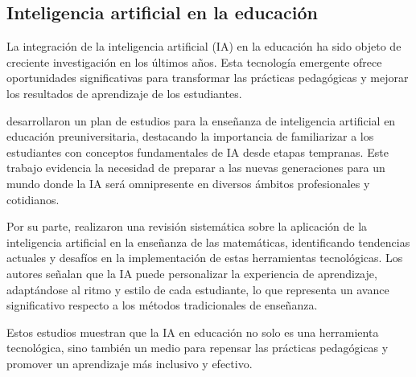 \subsection{Inteligencia artificial en la educación}

La integración de la inteligencia artificial (IA) en la educación ha sido objeto de creciente investigación en los últimos años. Esta tecnología emergente ofrece oportunidades significativas para transformar las prácticas pedagógicas y mejorar los resultados de aprendizaje de los estudiantes.

\cite{guerreirosantallaDesarrolloPlanEstudios2023} desarrollaron un plan de estudios para la enseñanza de inteligencia artificial en educación preuniversitaria, destacando la importancia de familiarizar a los estudiantes con conceptos fundamentales de IA desde etapas tempranas. Este trabajo evidencia la necesidad de preparar a las nuevas generaciones para un mundo donde la IA será omnipresente en diversos ámbitos profesionales y cotidianos.

Por su parte, \cite{panquebanInteligenciaArtificialEducacion2024a} realizaron una revisión sistemática sobre la aplicación de la inteligencia artificial en la enseñanza de las matemáticas, identificando tendencias actuales y desafíos en la implementación de estas herramientas tecnológicas. Los autores señalan que la IA puede personalizar la experiencia de aprendizaje, adaptándose al ritmo y estilo de cada estudiante, lo que representa un avance significativo respecto a los métodos tradicionales de enseñanza.

Estos estudios muestran que la IA en educación no solo es una herramienta tecnológica, sino también un medio para repensar las prácticas pedagógicas y promover un aprendizaje más inclusivo y efectivo.
